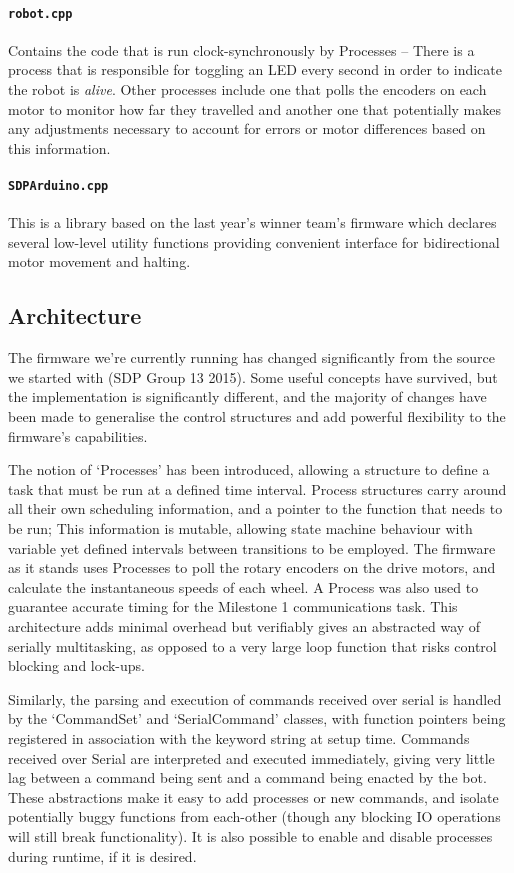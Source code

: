 \paragraph{\texttt{robot.cpp}} Contains the code that is run clock-synchronously by Processes -- There is a process that is responsible for toggling an LED every second in order to indicate the robot is \textit{alive}. Other processes include one that polls the encoders on each motor to monitor how far they travelled and another one that potentially makes any adjustments necessary to account for errors or motor differences based on this information.

\paragraph{\texttt{SDPArduino.cpp}} This is a library based on the last year's winner team's firmware which declares several low-level utility functions providing convenient interface for bidirectional motor movement and halting.

\subsection{Architecture}

The firmware we're currently running has changed significantly from the source we started with (SDP Group 13 2015). Some useful concepts have survived, but the implementation is significantly different, and the majority of changes have been made to generalise the control structures and add powerful flexibility to the firmware's capabilities.

The notion of `Processes' has been introduced, allowing a structure to define a task that must be run at a defined time interval. Process structures carry around all their own scheduling information, and a pointer to the function that needs to be run; This information is mutable, allowing state machine behaviour with variable yet defined intervals between transitions to be employed. The firmware as it stands uses Processes to poll the rotary encoders on the drive motors, and calculate the instantaneous speeds of each wheel. A Process was also used to guarantee accurate timing for the Milestone 1 communications task. This architecture adds minimal overhead but verifiably gives an abstracted way of serially multitasking, as opposed to a very large loop function that risks control blocking and lock-ups.

Similarly, the parsing and execution of commands received over serial is handled by the `CommandSet' and `SerialCommand' classes, with function pointers being registered in association with the keyword string at setup time. Commands received over Serial are interpreted and executed immediately, giving very little lag between a command being sent and a command being enacted by the bot. These abstractions make it easy to add processes or new commands, and isolate potentially buggy functions from each-other (though any blocking IO operations will still break functionality). It is also possible to enable and disable processes during runtime, if it is desired. 

